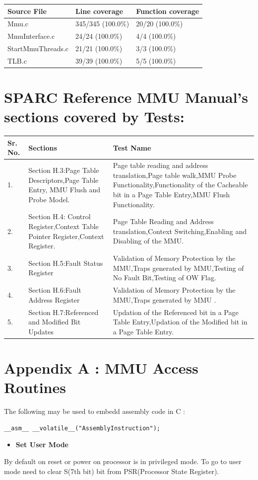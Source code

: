 \documentclass[12pt,a4paper]{article}
\begin{document}
\begin{tabular}{ |l|l|l| }
  \hline
  Source File & Line coverage & Function coverage\\
  \hline
  Mmu.c & 345/345 (100.0\%) & 20/20 (100.0\%) \\
  \hline
  MmuInterface.c & 24/24 (100.0\%) & 4/4 (100.0\%) \\
  \hline
  StartMmuThreads.c & 21/21 (100.0\%) & 3/3 (100.0\%) \\
  \hline
  TLB.c & 39/39 (100.0\%) & 5/5 (100.0\%) \\
  \hline
\end{tabular}
\section{SPARC Reference MMU Manual's sections covered by Tests:}
\begin{tabular}{ | l |p{5cm}|p{8cm}| }
  \hline
  Sr. No. & Sections & Test Name \\
  \hline
  1. & Section H.3:Page Table Descriptors,Page Table Entry,
  MMU Flush and Probe Model.  & Page table reading and address translation,Page table walk,MMU Probe Functionality,Functionality of the Cacheable bit in a Page Table Entry,MMU Flush Functionality. \\
  \hline
  2. & Section H.4: Control Register,Context Table Pointer
Register,Context Register. & Page Table Reading and Address translation,Context Switching,Enabling and Disabling of the MMU.  \\
  \hline
  3. & Section H.5:Fault Status Register & Validation of Memory Protection by the MMU,Traps generated by MMU,Testing of No Fault Bit,Testing of OW Flag.  \\
  \hline
  4. & Section H.6:Fault Address Register & Validation of Memory Protection by the MMU,Traps generated by MMU .  \\
  \hline
  5. & Section H.7:Referenced and Modified Bit
Updates & Updation of the Referenced bit in a Page Table Entry,Updation of the Modified bit in a Page Table Entry.   \\
  \hline
\end{tabular}




\newpage
\section{Appendix A : MMU Access Routines} \label{sec:MMU_Access_Routines}

The following may be used to embedd assembly code in C :
\begin{lstlisting}
__asm__ __volatile__("AssemblyInstruction");
 \end{lstlisting}
\begin{itemize}
\item \textbf{Set User Mode}
\end{itemize}
By default on reset or power on processor is in privileged mode. 
To go to user mode need to clear S(7th bit) bit from PSR(Processor State Register).
\end{document}
